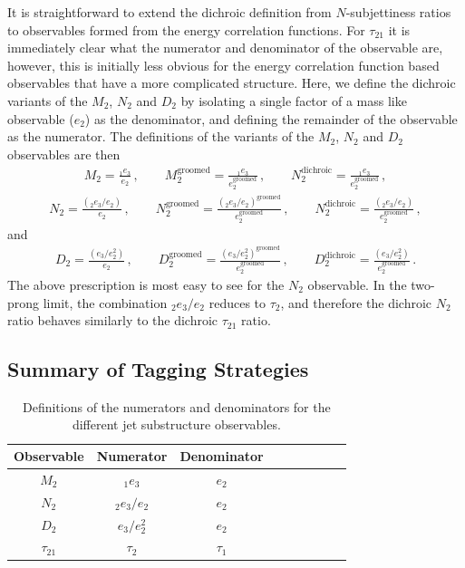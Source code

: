 \documentclass[11pt]{cernrep}
\begin{document}
It is straightforward to extend the dichroic definition from $N$-subjettiness ratios to observables formed from the energy correlation functions.
%
For $\tau_{21}$ it is immediately clear what the numerator and denominator of the observable are, however, this is initially less obvious for the energy correlation function based observables that have a more complicated structure.
%
Here, we define the dichroic variants of the $M_2$, $N_2$ and $D_2$ by isolating a single factor of a mass like observable ($e_2$) as the denominator, and defining the remainder of the observable as the numerator.
%
The definitions of the variants of the $M_2$, $N_2$ and $D_2$ observables are then
\begin{align}
M_2= \frac{ _1e_{3}  }{e_{2}}\,, \qquad  M_2^{\text{groomed}}= \frac{ _1e_{3}  }{e_{2}^\text{groomed}}\,, \qquad  N_2^{\text{dichroic}}= \frac{_1e_{3}  }{e_{2}^\text{groomed}}\,, 
\end{align}
\begin{align}
N_2= \frac{\left( _2e_{3} / e_{2} \right) }{e_{2}}\,, \qquad  N_2^{\text{groomed}}= \frac{\left( _{2}e_{3} / e_{2} \right)^\text{groomed} }{e_{2}^\text{groomed}}\,, \qquad  N_2^{\text{dichroic}}= \frac{\left( _{2}e_{3} / e_{2} \right) }{e_{2}^\text{groomed}}\,, 
\end{align}
and
\begin{align}
D_2=\frac{\left( e_{3} / e_{2}^2 \right)}{ e_{2}}\,, \qquad D_2^{\text{groomed}}=\frac{\left( e_{3} / e_{2}^2 \right)^\text{groomed}}{ e_{2}^\text{groomed}}\,, \qquad D_2^{\text{dichroic}}=\frac{\left( e_{3} / e_{2}^2 \right)}{ e_{2}^\text{groomed}}\,.
\end{align}
The above prescription is most easy to see for the $N_2$ observable. In the two-prong limit, the combination $ _{2}e_{3} / e_{2} $ reduces to $\tau_2$, and therefore the dichroic $N_2$ ratio behaves similarly to the dichroic $\tau_{21}$ ratio.

\subsection{Summary of Tagging Strategies}\label{jetsub_2prong_sec:dichroic_sum}



\begin{table}
\begin{center}
\begin{tabular}{| c | c | c |c |c|c|c |c|r| }
  \hline                       
  Observable &  Numerator & Denominator \\
  \hline
  $M_2$ &   $_{1}e_{3}$ & $ e_{2}$ \\
  $N_2$ &   $_{2}e_{3} / e_{2} $ & $ e_{2}$ \\
  $D_2$ &   $e_{3} / e_{2}^2 $ & $ e_{2}$ \\
  $\tau_{21}$ &   $\tau_2$ & $\tau_1$ \\
  \hline  
\end{tabular}
\end{center}
\caption{
Definitions of the numerators and denominators for the different jet substructure observables.
}
\label{jetsub_2prong_tab:dn}
\end{table}
\end{document}
